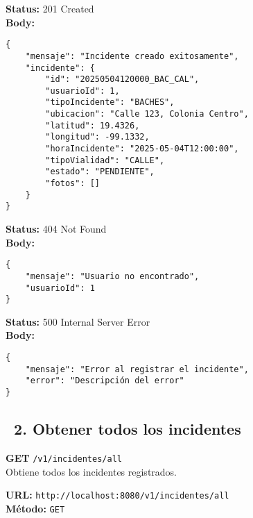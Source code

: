 \begin{tcolorbox}[response]
    \textbf{Status:} 201 Created\\
    \textbf{Body:}
    \begin{verbatim}
{
    "mensaje": "Incidente creado exitosamente",
    "incidente": {
        "id": "20250504120000_BAC_CAL",
        "usuarioId": 1,
        "tipoIncidente": "BACHES",
        "ubicacion": "Calle 123, Colonia Centro",
        "latitud": 19.4326,
        "longitud": -99.1332,
        "horaIncidente": "2025-05-04T12:00:00",
        "tipoVialidad": "CALLE",
        "estado": "PENDIENTE",
        "fotos": []
    }
}
    \end{verbatim}
\end{tcolorbox}

\begin{tcolorbox}[response]
    \textbf{Status:} 404 Not Found\\
    \textbf{Body:}
    \begin{verbatim}
{
    "mensaje": "Usuario no encontrado",
    "usuarioId": 1
}
    \end{verbatim}
\end{tcolorbox}

\begin{tcolorbox}[response]
    \textbf{Status:} 500 Internal Server Error\\
    \textbf{Body:}
    \begin{verbatim}
{
    "mensaje": "Error al registrar el incidente",
    "error": "Descripción del error"
}
    \end{verbatim}
\end{tcolorbox}

\subsection*{\faServer\ 2. Obtener todos los incidentes}
\begin{tcolorbox}[endpoint]
    \textbf{GET} \texttt{/v1/incidentes/all}\\
    Obtiene todos los incidentes registrados.
\end{tcolorbox}

\begin{tcolorbox}[request]
    \textbf{URL:} \textcolor{urlColor}{\texttt{http://localhost:8080/v1/incidentes/all}}\\
    \textbf{Método:} \textcolor{methodColor}{\texttt{GET}}
\end{tcolorbox}

